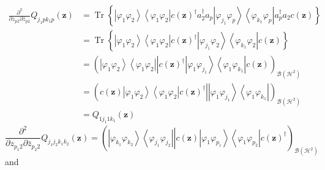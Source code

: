 \documentclass[aps,preprint]{revtex4}%
\begin{document}
\begin{align}
\frac{\partial^{2}}{\partial z_{p2}\partial\bar{z}_{p2}}Q_{j_{1}pk_{1}%
p}\left(  \mathbf{z}\right)   &  =\operatorname*{Tr}\left\{  \left\vert
\varphi_{1}\varphi_{2}\right\rangle \left\langle \varphi_{1}\varphi
_{2}\right\vert c\left(  \mathbf{z}\right)  ^{\dagger}a_{2}^{\dagger}%
a_{p}\left\vert \varphi_{j_{1}}\varphi_{p}\right\rangle \left\langle
\varphi_{k_{1}}\varphi_{p}\right\vert a_{p}^{\dagger}a_{2}c\left(
\mathbf{z}\right)  \right\}  \nonumber\\
&  =\operatorname*{Tr}\left\{  \left\vert \varphi_{1}\varphi_{2}\right\rangle
\left\langle \varphi_{1}\varphi_{2}\right\vert c\left(  \mathbf{z}\right)
^{\dagger}\left\vert \varphi_{j_{1}}\varphi_{2}\right\rangle \left\langle
\varphi_{k_{1}}\varphi_{2}\right\vert c\left(  \mathbf{z}\right)  \right\}
\nonumber\\
&  =\left(  \left.  \overset{}{\left\vert \varphi_{1}\varphi_{2}\right\rangle
\left\langle \varphi_{1}\varphi_{2}\right\vert }\right\vert c\left(
\mathbf{z}\right)  ^{\dagger}\left\vert \varphi_{1}\varphi_{j_{1}%
}\right\rangle \left\langle \varphi_{1}\varphi_{k_{1}}\right\vert c\left(
\mathbf{z}\right)  \right)  _{\mathcal{B}\left(  \mathcal{H}^{2}\right)
}\nonumber\\
&  =\left(  \left.  c\left(  \mathbf{z}\right)  \overset{}{\left\vert
\varphi_{1}\varphi_{2}\right\rangle \left\langle \varphi_{1}\varphi
_{2}\right\vert c\left(  \mathbf{z}\right)  ^{\dagger}}\right\vert \left\vert
\varphi_{1}\varphi_{j_{1}}\right\rangle \left\langle \varphi_{1}\varphi
_{k_{1}}\right\vert \right)  _{\mathcal{B}\left(  \mathcal{H}^{2}\right)
}\nonumber\\
&  =Q_{1j_{1}1k_{1}}\left(  \mathbf{z}\right)
\end{align}%
\begin{equation}
\frac{\partial^{2}}{\partial z_{p_{1}2}\partial\bar{z}_{p_{2}2}}Q_{j_{1}%
j_{2}k_{1}k_{2}}\left(  \mathbf{z}\right)  =\left(  \left.
\overset{}{\left\vert \varphi_{k_{1}}\varphi_{k_{2}}\right\rangle \left\langle
\varphi_{j_{1}}\varphi_{j_{2}}\right\vert }\right\vert c\left(  \mathbf{z}%
\right)  \left\vert \varphi_{1}\varphi_{p_{1}}\right\rangle \left\langle
\varphi_{1}\varphi_{p_{2}}\right\vert c\left(  \mathbf{z}\right)  ^{\dagger
}\right)  _{\mathcal{B}\left(  \mathcal{H}^{2}\right)  }%
\end{equation}
and
\end{document}
